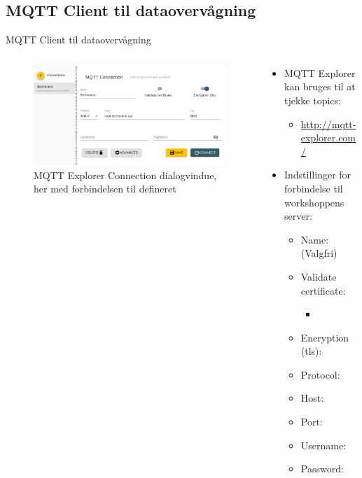 \documentclass[aspectratio=169]{beamer}
\begin{document}
\subsection{MQTT Client til dataovervågning}
\begin{frame}{MQTT Client til dataovervågning}
\begin{columns}
\begin{column}{0.6\textwidth}
		\centering
		\begin{figure}
  			\includegraphics[width=\textwidth]{assets/pictures/mqtt-explorer.png}
  			\caption{MQTT Explorer Connection dialogvindue, her med forbindelsen til  defineret}
  			\label{fig:mqtt-explorer}
		\end{figure}
	\end{column}
	\begin{column}{0.4\textwidth}
		\begin{textBox}
		\begin{itemize}
			\item MQTT Explorer kan bruges til at tjekke topics:
			\begin{itemize}
				\item \small\url{http://mqtt-explorer.com/}
			\end{itemize}
			\item Indstillinger for forbindelse til workshoppens  server:
			\begin{itemize}
				\item Name:  (Valgfri)	
				\item Validate certificate:	  
				\begin{itemize}
					\item {}
				\end{itemize}
				\item Encryption (tls):	  
				\item Protocol: 
				\item Host: 
				\item Port: 
				\item Username: 
				\item Password: 
			\end{itemize}
		\end{itemize}
		\end{textBox}
	\end{column}
\end{columns}
\end{frame}
\end{document}
